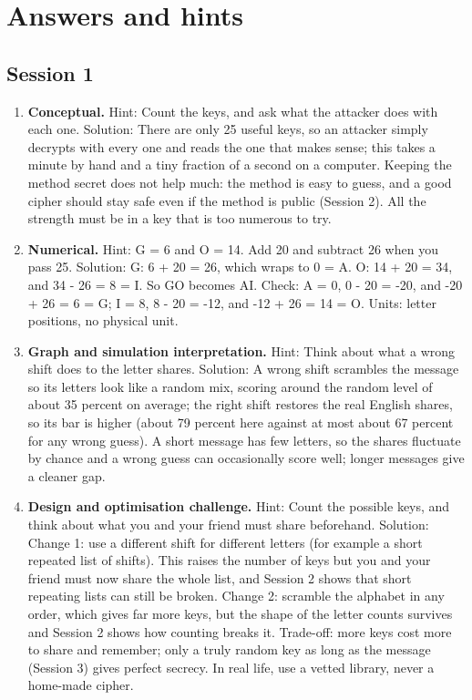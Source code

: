 \documentclass[11pt,a4paper]{article}
\begin{document}
\section{Answers and hints}

\subsection*{Session 1}
\begin{enumerate}[nosep]
\item \textbf{Conceptual.} Hint: Count the keys, and ask what the attacker does with each one. Solution: There are only 25 useful keys, so an attacker simply decrypts with every one and reads the one that makes sense; this takes a minute by hand and a tiny fraction of a second on a computer. Keeping the method secret does not help much: the method is easy to guess, and a good cipher should stay safe even if the method is public (Session 2). All the strength must be in a key that is too numerous to try.
\item \textbf{Numerical.} Hint: G = 6 and O = 14. Add 20 and subtract 26 when you pass 25. Solution: G: 6 + 20 = 26, which wraps to 0 = A. O: 14 + 20 = 34, and 34 - 26 = 8 = I. So GO becomes AI. Check: A = 0, 0 - 20 = -20, and -20 + 26 = 6 = G; I = 8, 8 - 20 = -12, and -12 + 26 = 14 = O. Units: letter positions, no physical unit.
\item \textbf{Graph and simulation interpretation.} Hint: Think about what a wrong shift does to the letter shares. Solution: A wrong shift scrambles the message so its letters look like a random mix, scoring around the random level of about 35 percent on average; the right shift restores the real English shares, so its bar is higher (about 79 percent here against at most about 67 percent for any wrong guess). A short message has few letters, so the shares fluctuate by chance and a wrong guess can occasionally score well; longer messages give a cleaner gap.
\item \textbf{Design and optimisation challenge.} Hint: Count the possible keys, and think about what you and your friend must share beforehand. Solution: Change 1: use a different shift for different letters (for example a short repeated list of shifts). This raises the number of keys but you and your friend must now share the whole list, and Session 2 shows that short repeating lists can still be broken. Change 2: scramble the alphabet in any order, which gives far more keys, but the shape of the letter counts survives and Session 2 shows how counting breaks it. Trade-off: more keys cost more to share and remember; only a truly random key as long as the message (Session 3) gives perfect secrecy. In real life, use a vetted library, never a home-made cipher.
\end{enumerate}
\end{document}
